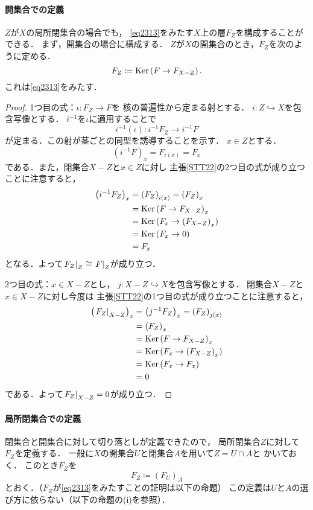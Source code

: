 \paragraph{開集合での定義}
\(Z\)が\(X\)の局所閉集合の場合でも，
\eqref{eq2313}をみたす\(X\)上の層\(F_Z\)を構成することができる．
まず，開集合の場合に構成する．
\(Z\)が\(X\)の開集合のとき，\(F_Z\)を次のように定める．
\[
    F_Z\coloneqq \Ker\left(F\to F_{X-Z}\right).
\]
これは\eqref{eq2313}をみたす．
\begin{proof}
    1つ目の式：\(\iota\colon F_Z\to F\)を
    核の普遍性から定まる射とする．
    \(i\colon Z\hookrightarrow X\)を包含写像とする．
    \(i^{-1}\)を\(\iota\)に適用することで\[
        i^{-1}(\iota)\colon i^{-1}F_Z\to i^{-1}F
    \]が定まる．この射が茎ごとの同型を誘導することを示す．
    \(x\in Z\)とする．\[
        \left(i^{-1}F\right)_{x}=F_{i(x)}=F_x
    \]である．また，閉集合\(X-Z\)と\(x\in Z\)に対し
    主張\ref{STT22}の2つ目の式が成り立つことに注意すると，
    \begin{align*}
        \left(i^{-1}F_Z\right)_{x}
        &=\left(F_Z\right)_{i(x)}=\left(F_Z\right)_x\\
        &=\Ker\left(F\to F_{X-Z}\right)_{x}\\
        &=\Ker\left(F_{x}\to \left(F_{X-Z}\right)_{x}\right)\\
        &=\Ker\left(F_{x}\to 0\right)\\
        &=F_{x}
    \end{align*}
    となる．よって\(
        \mres[F_{Z}]{Z}\cong \mres[F]{Z}
    \)が成り立つ．

    2つ目の式：\(x\in X-Z\)とし，
    \(j\colon X-Z\hookrightarrow X\)を包含写像とする．
    閉集合\(X-Z\)と\(x\in X-Z\)に対し今度は
    主張\ref{STT22}の1つ目の式が成り立つことに注意すると，
    \begin{align*}
        \left(\mres[F_Z]{X-Z}\right)_{x}
        &=\left(j^{-1}F_Z\right)_{x}=\left(F_Z\right)_{j(x)}\\
        &=\left(F_Z\right)_{x}\\
        &=\Ker\left(F\to F_{X-Z}\right)_{x}\\
        &=\Ker\left(F_{x}\to \left(F_{X-Z}\right)_{x}\right)\\
        &=\Ker\left(F_{x}\to F_x\right)\\
        &=0
    \end{align*}
    である．よって\(\mres[F_Z]{X-Z}=0\)が成り立つ．
\end{proof}
\paragraph{局所閉集合での定義}
閉集合と開集合に対して切り落としが定義できたので，
局所閉集合\(Z\)に対して\(F_Z\)を定義する．
一般に\(X\)の開集合\(U\)と閉集合\(A\)を用いて\(Z=U\cap A\)と
かいておく．
このとき\(F_Z\)を
\[
    F_Z\coloneqq \left(F_U\right)_A
\]
とおく．（\(F_Z\)が\eqref{eq2313}をみたすことの証明は以下の命題）
この定義は\(U\)と\(A\)の選び方に依らない（以下の命題の(i)を参照）．

